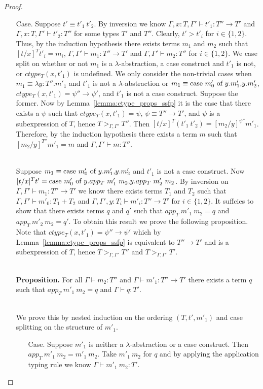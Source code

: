 \begin{proof}
\begin{itemize}
\item[Case.] Suppose $t' \equiv t'_1\ t'_2$.  By inversion we know
  $\Gamma, x:T, \Gamma' \vdash t'_1 : T'' \to T'$ and
  $\Gamma, x:T, \Gamma' \vdash t'_2 : T''$ for some types $T'$ and $T''$.
  Clearly, $t' > t'_i$ for $i \in \{1,2\}$.  Thus, by the induction hypothesis
  there exists terms $m_1$ and $m_2$ such that $[t/x]^T t'_i = m_i$,
  $\Gamma, \Gamma' \vdash m_1 : T'' \to T'$ and
  $\Gamma, \Gamma' \vdash m_2 : T''$ for
  $i \in \{1,2\}$.  We case split on whether or not $m_1$ is a $\lambda$-abstraction,
  a case construct and $t'_1$ is not, or $ctype_T(x,t'_1)$ is undefined.  
  We only consider the non-trivial cases when 
  $m_1 \equiv \lambda y:T''.m'_1$ and $t'_1$ is not a $\lambda$-abstraction or $m_1 \equiv \mbox{case}\ m'_0\ \text{of}\ y\text{.}m'_1\text{,}y\text{.}m'_2$,
  $ctype_T(x,t'_1) = \psi'' \to \psi'$, and $t'_1$ is not a case construct.  Suppose the former.  
  Now by Lemma~\ref{lemma:ctype_props_ssfp} it is the case that 
  there exists a $\psi$ such that $ctype_T(x,t'_1) = \psi$, 
  $\psi \equiv T'' \to T'$, and $\psi$ is a subexpression of $T$, hence
  $T >_{\Gamma,\Gamma'} T''$.
  Then $[t/x]^T (t'_1\ t'_2) = [m_2/y]^{\psi''} m'_1$.  
  Therefore, by the induction hypothesis there exists a 
  term $m$ such that $[m_2/y]^{T''} m'_1 = m$ and $\Gamma,\Gamma' \vdash m:T''$.
  
  \ \\
  Suppose $m_1 \equiv \mbox{case}\ m'_0\ \text{of}\ y\text{.}m'_1\text{,}y\text{.}m'_2$ and $t'_1$ is not a case construct.
  Now $[t/x]^T t' = \mbox{case}\ m'_0\ \text{of}\ y\text{.}app_T\ m'_1\ m_2\text{,}y\text{.}app_T\ m'_2\ m_2$.  By inversion on
  $\Gamma,\Gamma' \vdash m_1 : T'' \to T'$ we know there exists terms $T_1$ and $T_2$ such that
  $\Gamma,\Gamma' \vdash m'_0:T_1+T_2$ and
  $\Gamma,\Gamma',y:T_i \vdash m'_i:T'' \to T'$
  for $i \in \{1,2\}$.  It suffcies to show that
  there exists terms $q$ and $q'$ such that $app_T\ m'_1\ m_2 = q$ and $app_T\ m'_2\ m_2 = q'$.  To obtain
  this result we prove the following proposition.  Note that $ctype_T(x,t'_1) = \psi'' \to \psi'$ which
  by Lemma~\ref{lemma:ctype_props_ssfp} is equivalent to $T'' \to T'$ and is 
  a subexpression of $T$, hence $T >_{\Gamma,\Gamma'} T''$ and $T >_{\Gamma,\Gamma'} T'$.

  \ \\
  {\bf Proposition.}  For all 
  $\Gamma \vdash m_2 : T''$ and $\Gamma \vdash m'_1:T'' \to T'$
  there exists a term $q$ such that $app_T\ m'_1\ m_2 = q$ and $\Gamma \vdash q:T'$.
  
  \ \\
  We prove this by nested induction on the ordering $(T, t', m'_1)$ and case splitting on 
  the structure of $m'_1$.
  \begin{itemize}
  \item[Case.] Suppose $m'_1$ is neither a $\lambda$-abstraction or a case construct.  Then\\
    $app_T\  m'_1\ m_2 = m'_1\ m_2$.  Take $m'_1\ m_2$ for $q$ and by applying the application typing rule
    we know $\Gamma \vdash m'_1\ m_2:T'$.
    

\end{itemize}
\end{itemize}
\end{proof}
